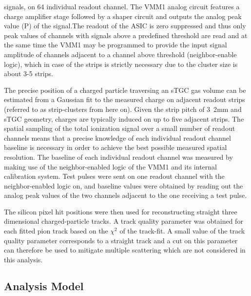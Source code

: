 	signals, on 64 individual readout channel. The VMM1 analog circuit features a charge amplifier stage followed by a
	shaper circuit and outputs the analog peak value (P) of the signal.The readout of the ASIC is zero suppressed and thus
	only peak values of channels with signals above a predefined threshold are read and at the same time the VMM1 may be
	programmed to provide the input signal amplitude of channels adjacent to a channel above threshold (neighbor-enable
	logic), which in case of the strips is strictly necessary due to the cluster size is about 3-5 strips.\par
	The precise position of a charged particle traversing an sTGC gas volume can be estimated from a Gaussian fit to the
	measured charge on adjacent readout strips (referred to as strip-clusters from here on). Given the strip pitch of
	\unit{3.2}{mm}
	and sTGC geometry, charges are typically induced on up to five adjacent strips. The spatial sampling of the total
	ionization signal over a small number of readout channels means that a precise knowledge of each individual readout
	channel baseline is necessary in order to achieve the best possible measured spatial resolution. The baseline of each
	individual readout channel was measured by making use of the neighbor-enabled logic of the VMM1 and its internal
	calibration system. Test pulses were sent on one readout channel with the neighbor-enabled logic on, and baseline
	values were obtained by reading out the analog peak values of the two channels adjacent to the one receiving a test
	pulse.\par
	The silicon pixel hit positions were then used for reconstructing straight three dimensional charged-particle tracks. A
	track quality parameter was obtained for each fitted pion track based on the $\chi^2$ of the track-fit. A small value of the track quality parameter corresponds to a straight track and a cut on this parameter can therefore be used to mitigate
	multiple scattering which are not considered in this analysis.
	\subsection{Analysis Model}
